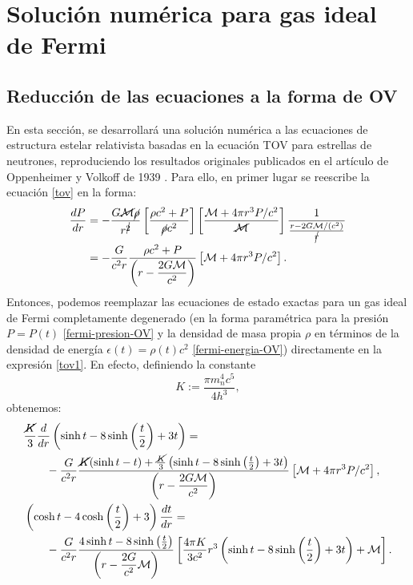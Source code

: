 \section{Solución numérica para gas ideal de Fermi}
\subsection{Reducción de las ecuaciones a la forma de OV}
En esta sección, se desarrollará una solución numérica a las ecuaciones de estructura estelar relativista basadas en la ecuación TOV para estrellas de neutrones, reproduciendo los resultados originales publicados en el artículo de  Oppenheimer y Volkoff de 1939 \cite{Oppenheimer39enero}. Para ello, en primer lugar se reescribe la ecuación  \eqref{tov} en la forma:
\begin{align}
\frac{dP}{dr}&=-\frac{G\cancel{\mathcal{M}}\cancel{\rho}}{r^{\cancel{2}}}\left[\frac{\rho c^2+P}{\cancel{\rho} c^2}\right]\left[ \frac{\mathcal{M}+4\pi r^3P/c^2}{\cancel{\mathcal{M}}}\right]\frac{1}{\frac{r-2G\mathcal{M}/(c^2)}{\cancel{r}}}\\
&=-\frac{G}{c^2r}\frac{\rho c^2+P}{\left(r-\dfrac{2G\mathcal{M}}{c^2}\right)}\left[\mathcal{M}+4\pi r^3P/c^2\right].\label{tov1}
\end{align}
Entonces, podemos reemplazar las ecuaciones de estado exactas para un gas ideal de Fermi completamente degenerado (en la forma paramétrica para la presión $P=P(t)$ \eqref{fermi-presion-OV} y la densidad de masa propia $\rho$ en términos de la densidad de energía $\epsilon(t)=\rho(t) c^2$ \eqref{fermi-energia-OV})  directamente en la expresión \eqref{tov1}. En efecto, definiendo la constante
\begin{equation}\label{fermi-rel-k}
 K:=\frac{\pi m_{n}^4 c^5}{4h^3},
\end{equation}
obtenemos:
\begin{align}
&\frac{\cancel{K}}{3}\frac{d}{dr}\left(\sinh t-8\sinh \left(\frac{t}{2}\right)+3t\right)= \nonumber \\
&\qquad -\frac{G}{c^2r}\frac{\cancel{K}(\sinh t-t)+\frac{\cancel{K}}{3}\left(\sinh t-8\sinh \left(\frac{t}{2}\right)+3t\right)}{\left(r-\dfrac{2G\mathcal{M}}{c^2}\right)}\left[\mathcal{M}+4\pi r^3P/c^2\right],\\
%
&\left(\cosh t-4\cosh \left(\frac{t}{2}\right)+3\right)\frac{dt}{dr}=\\
&\qquad -\frac{G}{c^2r}\frac{4\sinh t-8\sinh\left(\frac{t}{2}\right)}{\left(r-\dfrac{2G}{c^2}\mathcal{M}\right)}\left[\frac{4\pi K}{3c^2} r^3\left(\sinh t-8\sinh \left(\frac{t}{2}\right)+3t\right)+\mathcal{M}\right].
\end{align}
